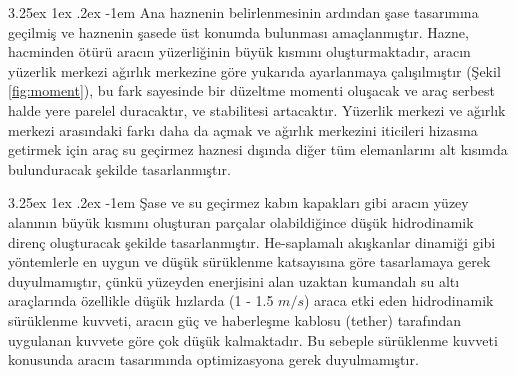 \documentclass[12pt]{article}
\makeatletter
\renewcommand\paragraph{\@startsection{paragraph}{5}{\z@}%
  {3.25ex \@plus1ex \@minus.2ex}%
  {-1em}%
  {\normalfont\normalsize\bfseries}}
\makeatother
\begin{document}
\paragraph{} Ana haznenin belirlenmesinin ardından şase tasarımına geçilmiş ve haznenin şasede üst konumda bulunması amaçlanmıştır. Hazne, hacminden ötürü aracın yüzerliğinin büyük kısmını oluşturmaktadır, aracın yüzerlik merkezi ağırlık merkezine göre yukarıda ayarlanmaya çalışılmıştır (Şekil \ref{fig:moment}), bu fark sayesinde bir düzeltme momenti oluşacak ve araç serbest halde yere parelel duracaktır, ve stabilitesi artacaktır.\cite{BOOK:rovmanual} Yüzerlik merkezi ve ağırlık merkezi arasındaki farkı daha da açmak ve ağırlık merkezini iticileri hizasına getirmek için araç su geçirmez haznesi dışında diğer tüm elemanlarını alt kısımda bulunduracak şekilde tasarlanmıştır.

\newpage

\paragraph{}Şase ve su geçirmez kabın kapakları gibi aracın yüzey alanının büyük kısmını oluşturan parçalar olabildiğince düşük hidrodinamik direnç oluşturacak şekilde tasarlanmıştır. He-saplamalı akışkanlar dinamiği gibi yöntemlerle en uygun ve düşük sürüklenme katsayısına göre tasarlamaya gerek duyulmamıştır, çünkü yüzeyden enerjisini alan uzaktan kumandalı su altı araçlarında özellikle düşük hızlarda (1 - 1.5 $m/s$) araca etki eden hidrodinamik sürüklenme kuvveti, aracın güç ve haberleşme kablosu (tether) tarafından uygulanan kuvvete göre çok düşük kalmaktadır.\cite{BOOK:rovmanual} Bu sebeple sürüklenme kuvveti konusunda aracın tasarımında optimizasyona gerek duyulmamıştır.
\end{document}
